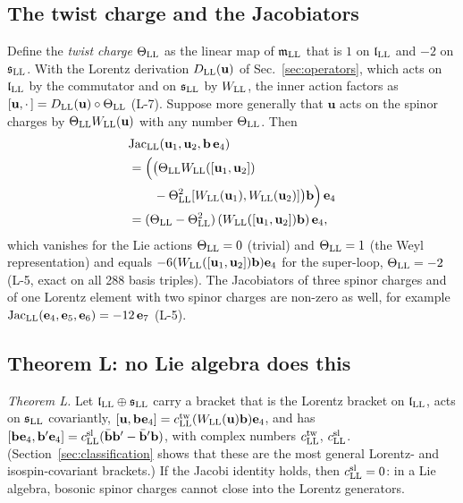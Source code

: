 \subsection{The twist charge and the Jacobiators}

Define the \emph{twist charge} $\Theta_{\rm LL}$ as the linear map of $\mathfrak m_{\rm LL}$ that is $1$
on $\mathfrak l_{\rm LL}$ and $-2$ on $\mathfrak s_{\rm LL}$. With the Lorentz derivation $D_{\rm
LL}(\mathbf u)$ of Sec.~\ref{sec:operators}, which acts on $\mathfrak l_{\rm LL}$ by the commutator and on
$\mathfrak s_{\rm LL}$ by $W_{\rm LL}$, the inner action factors as $[\mathbf u,\cdot\,]=D_{\rm
LL}(\mathbf u)\circ\Theta_{\rm LL}$ (L-7). Suppose more generally that $\mathbf u$ acts on the spinor
charges by $\Theta_{\rm LL}W_{\rm LL}(\mathbf u)$ with any number $\Theta_{\rm LL}$. Then
\begin{align}
&\mathrm{Jac}_{\rm LL}(\mathbf u_1,\mathbf u_2,\mathbf b\,\mathbf e_4)\nonumber\\
&=\Big(\big(\Theta_{\rm LL}W_{\rm LL}([\mathbf u_1,\mathbf u_2])\nonumber\\
&\qquad-\Theta_{\rm LL}^2[W_{\rm LL}(\mathbf u_1),W_{\rm LL}(\mathbf u_2)]\big)\mathbf b\Big)\,\mathbf e_4\nonumber\\
&=(\Theta_{\rm LL}-\Theta_{\rm LL}^2)\,(W_{\rm LL}([\mathbf u_1,\mathbf u_2])\mathbf b)\,\mathbf e_4 ,
\label{eq:jacluu}
\end{align}
which vanishes for the Lie actions $\Theta_{\rm LL}=0$ (trivial) and $\Theta_{\rm LL}=1$ (the Weyl
representation) and equals $-6(W_{\rm LL}([\mathbf u_1,\mathbf u_2])\mathbf b)\mathbf e_4$ for the
super-loop, $\Theta_{\rm LL}=-2$ (L-5, exact on all 288 basis triples). The Jacobiators of three spinor
charges and of one Lorentz element with two spinor charges are non-zero as well, for example
$\mathrm{Jac}_{\rm LL}(\mathbf e_4,\mathbf e_5,\mathbf e_6)=-12\,\mathbf e_7$ (L-5).

\subsection{Theorem L: no Lie algebra does this}

\noindent\emph{Theorem L.} Let $\mathfrak l_{\rm LL}\oplus\mathfrak s_{\rm LL}$ carry a bracket that is
the Lorentz bracket on $\mathfrak l_{\rm LL}$, acts on $\mathfrak s_{\rm LL}$ covariantly, $[\mathbf
u,\mathbf b\mathbf e_4]=c^{\rm tw}_{\rm LL}(W_{\rm LL}(\mathbf u)\mathbf b)\mathbf e_4$, and has
$[\mathbf b\mathbf e_4,\mathbf b'\mathbf e_4]=c^{\rm sl}_{\rm LL}(\bar{\mathbf b}\mathbf b'-\bar{\mathbf
b}'\mathbf b)$, with complex numbers $c^{\rm tw}_{\rm LL}$, $c^{\rm sl}_{\rm LL}$. (Section~\ref{sec:classification}
shows that these are the most general Lorentz- and isospin-covariant brackets.) If the Jacobi identity
holds, then $c^{\rm sl}_{\rm LL}=0$: in a Lie algebra, bosonic spinor charges cannot close into the
Lorentz generators.

